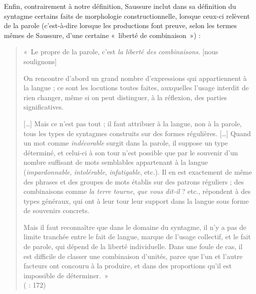 {    Enfin, contrairement à notre définition, Saussure inclut dans sa définition du syntagme certains faits de morphologie constructionnelle, lorsque ceux-ci relèvent de la parole (c’est-à-dire lorsque les productions font preuve, selon les termes mêmes de Saussure, d’une certaine «~liberté de combinaison~») :

    \begin{quote}
    «~Le propre de la parole, c’est \textit{la liberté des combinaisons}. [nous soulignons]

    On rencontre d’abord un grand nombre d’expressions qui appartiennent à la langue ; ce sont les locutions toutes faites, auxquelles l’usage interdit de rien changer, même si on peut distinguer, à la réflexion, des parties significatives.

    […] Mais ce n’est pas tout ; il faut attribuer à la langue, non à la parole, tous les types de {syntagmes} construits sur des formes régulières. […] Quand un mot comme \textit{indécorable} surgit dans la parole, il suppose un type déterminé, et celui-ci à son tour n’est possible que par le souvenir d’un nombre suffisant de mots semblables appartenant à la langue (\textit{impardonnable}, \textit{intolérable}, \textit{infatigable}, etc.). Il en est exactement de même des phrases et des groupes de mots établis sur des patrons réguliers ; des combinaisons comme \textit{la terre tourne}, \textit{que vous dit-il} ? etc., répondent à des types généraux, qui ont à leur tour leur support dans la langue sous forme de souvenirs concrets.

    Mais il faut reconnaître que dans le domaine du {syntagme}, il n’y a pas de limite tranchée entre le fait de langue, marque de l’usage collectif, et le fait de parole, qui dépend de la liberté individuelle. Dans une foule de cas, il est difficile de classer une combinaison d’unités, parce que l’un et l’autre facteurs ont concouru à la produire, et dans des proportions qu’il est impossible de déterminer.~»\\
    (\citealt{saussure1916cours} : 172)
    \end{quote}

}
